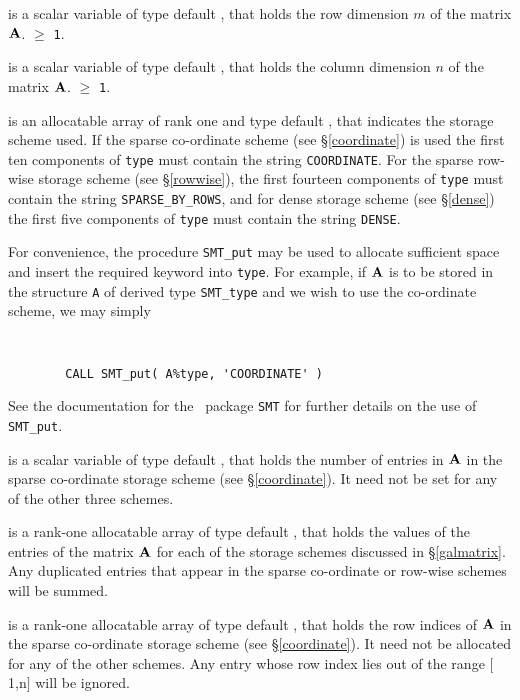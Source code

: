 \documentclass{galahad}
\begin{document}
\begin{description}

 is a scalar variable of type default \integer, that holds
the row dimension $m$ of the matrix  ${\mathbf{A}}$.
 $\geq$ {\tt 1}.

 is a scalar variable of type default \integer, that holds
the column dimension $n$ of the matrix  ${\mathbf{A}}$.
 $\geq$ {\tt 1}.

 is an allocatable array of rank one and type default \character, that
indicates the storage scheme used. If the
sparse co-ordinate scheme (see \S\ref{coordinate}) is used
the first ten components of {\tt type} must contain the
string {\tt COORDINATE}.
For the sparse row-wise storage scheme (see \S\ref{rowwise}),
the first fourteen components of {\tt type} must contain the
string {\tt SPARSE\_BY\_ROWS}, and
for dense storage scheme (see \S\ref{dense})
the first five components of {\tt type} must contain the
string {\tt DENSE}.

For convenience, the procedure {\tt SMT\_put}
may be used to allocate sufficient space and insert the required keyword
into {\tt type}.
For example, if ${\mathbf{A}}$ is to be stored in the structure {\tt A}
of derived type {\tt SMT\_type} and we wish to use
the co-ordinate scheme, we may simply
{\tt
\begin{verbatim}
        CALL SMT_put( A%type, 'COORDINATE' )
\end{verbatim}
}
\noindent
See the documentation for the \galahad\ package {\tt SMT}
for further details on the use of {\tt SMT\_put}.

 is a scalar variable of type default \integer, that
holds the number of entries in ${\mathbf{A}}$
in the sparse co-ordinate storage scheme (see \S\ref{coordinate}).
It need not be set for any of the other three schemes.

 is a rank-one allocatable array of type default \realdp, that holds
the values of the entries of the matrix ${\mathbf{A}}$ for each of the
storage schemes discussed in \S\ref{galmatrix}.
Any duplicated entries that appear in the sparse
co-ordinate or row-wise schemes will be summed.

 is a rank-one allocatable array of type default \integer,
that holds the row indices of ${\mathbf{A}}$ in the sparse co-ordinate storage
scheme (see \S\ref{coordinate}).
It need not be allocated for any of the other schemes.
Any entry whose row index lies out of the range $[$1,n$]$ will be ignored.


\end{description}
\end{document}
